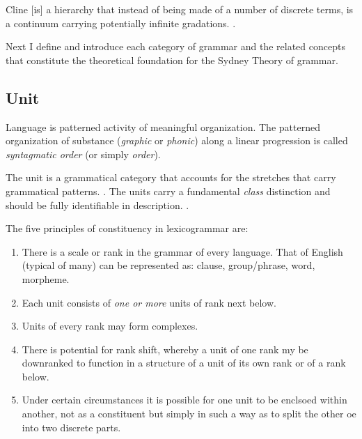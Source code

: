 \begin{definition}[Cline]\label{def:cline}
	Cline [is] a hierarchy that instead of being made of a number of discrete terms, is a continuum carrying potentially infinite gradations.
	\citep[p.42]{Halliday2002}. 
\end{definition}

Next I define and introduce each category of grammar and the related concepts that constitute the theoretical foundation for the Sydney Theory of grammar.

\subsection{Unit}
\label{sec:unit-sydney}
Language is patterned activity of meaningful organization. The patterned organization of substance (\textit{graphic} or \textit{phonic}) along a linear progression is called \textit{syntagmatic order} (or simply \textit{order}). 

\begin{definition}[Unit]\label{def:unit}
	The unit is a grammatical category that accounts for the stretches that carry grammatical patterns. \citep[p.42]{Halliday2002}.
	The units carry a fundamental \textit{class} distinction and should be fully identifiable in description. \citep[p.45]{Halliday2002}.
\end{definition}

\begin{generalization}\label{def:constituency-principles}
	The five principles of constituency in lexicogrammar are:
	\begin{enumerate}
		\item There is a scale or rank in the grammar of every language. That of English (typical of many) can be represented as: clause, group/phrase, word, morpheme.
		\item Each unit consists of \textit{one or more} units of rank next below.
		\item Units of every rank may form complexes.
		\item There is potential for rank shift, whereby a unit of one rank my be downranked to function in a structure of a unit of its own rank or of a rank below. 
		\item Under certain circumstances it is possible for one unit to be enclsoed within another, not as a constituent but simply in such a way as to split the other oe into two discrete parts. \citep[pp.9--10]{Halliday2013} 
	\end{enumerate}
\end{generalization}

